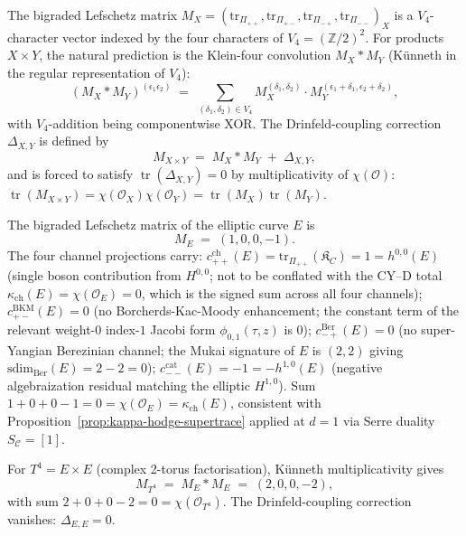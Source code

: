 The bigraded Lefschetz matrix
$M_X = (\mathrm{tr}_{\Pi_{++}}, \mathrm{tr}_{\Pi_{+-}},
\mathrm{tr}_{\Pi_{-+}}, \mathrm{tr}_{\Pi_{--}})_X$ is a
$V_4$-character vector indexed by the four characters of
$V_4 = (\mathbb{Z}/2)^2$. For products $X \times Y$, the natural
prediction is the Klein-four convolution
$M_X * M_Y$ (Künneth in the regular representation of $V_4$):
\[
 (M_X * M_Y)^{(\epsilon_1 \epsilon_2)}
 \;=\; \sum_{(\delta_1, \delta_2) \in V_4}
 M_X^{(\delta_1, \delta_2)} \cdot
 M_Y^{(\epsilon_1 + \delta_1, \epsilon_2 + \delta_2)},
\]
with $V_4$-addition being componentwise XOR. The Drinfeld-coupling
correction $\Delta_{X, Y}$ is defined by
\[
 M_{X \times Y} \;=\; M_X * M_Y \;+\; \Delta_{X, Y},
\]
and is forced to satisfy $\operatorname{tr}(\Delta_{X, Y}) = 0$ by
multiplicativity of $\chi(\mathcal{O})$:
$\operatorname{tr}(M_{X \times Y}) = \chi(\mathcal{O}_X)
\chi(\mathcal{O}_Y) = \operatorname{tr}(M_X) \operatorname{tr}(M_Y)$.

\begin{proposition}
\label{prop:elliptic-bigraded-matrix}
The bigraded Lefschetz matrix of the elliptic curve $E$ is
\[
 \boxed{\;M_E \;=\; (1, 0, 0, -1).\;}
\]
The four channel projections carry: $c_{++}^{\mathrm{ch}}(E)
= \mathrm{tr}_{\Pi_{++}}(\mathfrak{K}_C) = 1 = h^{0,0}(E)$
\textup{(}single boson contribution from $H^{0,0}$; not to be conflated
with the CY--D total $\kappa_{\mathrm{ch}}(E) = \chi(\mathcal{O}_E) = 0$,
which is the signed sum across all four channels\textup{);}
$c_{+-}^{\mathrm{BKM}}(E) = 0$ \textup{(}no Borcherds-Kac-Moody
enhancement; the constant term of the relevant weight-$0$ index-$1$
Jacobi form $\phi_{0, 1}(\tau, z)$ is $0$\textup{);}
$c_{-+}^{\mathrm{Ber}}(E) = 0$ \textup{(}no super-Yangian Berezinian
channel; the Mukai signature of $E$ is $(2, 2)$ giving
$\mathrm{sdim}_{\mathrm{Ber}}(E) = 2 - 2 = 0$\textup{);}
$c_{--}^{\mathrm{cat}}(E) = -1 = -h^{1, 0}(E)$
\textup{(}negative algebraization residual matching the elliptic
$H^{1, 0}$\textup{).} Sum
$1 + 0 + 0 - 1 = 0 = \chi(\mathcal{O}_E) = \kappa_{\mathrm{ch}}(E)$,
consistent with Proposition~\ref{prop:kappa-hodge-supertrace} applied
at $d = 1$ via Serre duality $S_\mathcal{C} = [1]$.
\end{proposition}

\begin{proposition}
\label{prop:t4-via-kunneth}
For $T^4 = E \times E$ (complex 2-torus factorisation), Künneth
multiplicativity gives
\[
 M_{T^4} \;=\; M_E * M_E \;=\; (2, 0, 0, -2),
\]
with sum $2 + 0 + 0 - 2 = 0 = \chi(\mathcal{O}_{T^4})$. The
Drinfeld-coupling correction vanishes:
$\Delta_{E, E} = 0$.
\end{proposition}

